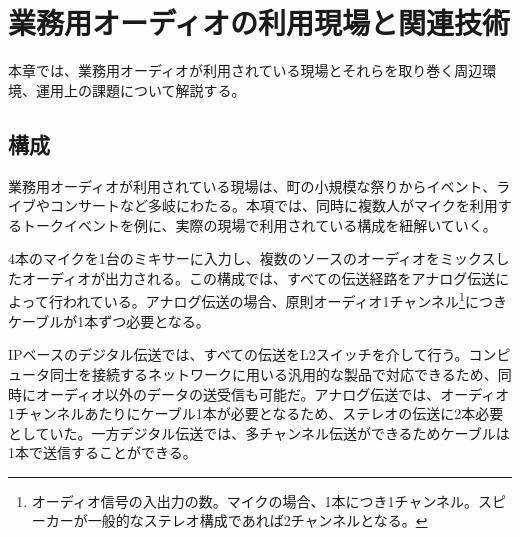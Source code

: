 \chapter{業務用オーディオの利用現場と関連技術}
\label{chap:related_works}

本章では、業務用オーディオが利用されている現場とそれらを取り巻く周辺環境、運用上の課題について解説する。

\section{構成}

業務用オーディオが利用されている現場は、町の小規模な祭りからイベント、ライブやコンサートなど多岐にわたる。本項では、同時に複数人がマイクを利用するトークイベントを例に、実際の現場で利用されている構成を紐解いていく。



4本のマイクを1台のミキサーに入力し、複数のソースのオーディオをミックスしたオーディオが出力される。この構成では、すべての伝送経路をアナログ伝送によって行われている。アナログ伝送の場合、原則オーディオ1チャンネル\footnote{オーディオ信号の入出力の数。マイクの場合、1本につき1チャンネル。スピーカーが一般的なステレオ構成であれば2チャンネルとなる。}につきケーブルが1本ずつ必要となる。



IPベースのデジタル伝送では、すべての伝送をL2スイッチを介して行う。コンピュータ同士を接続するネットワークに用いる汎用的な製品で対応できるため、同時にオーディオ以外のデータの送受信も可能だ。アナログ伝送では、オーディオ1チャンネルあたりにケーブル1本が必要となるため、ステレオの伝送に2本必要としていた。一方デジタル伝送では、多チャンネル伝送ができるためケーブルは1本で送信することができる。

